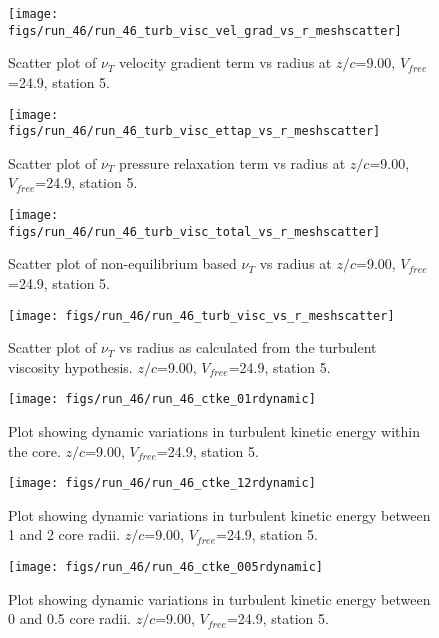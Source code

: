 \begin{figure}[H]
\centering
\texttt{[image: figs/run\_46/run\_46\_turb\_visc\_vel\_grad\_vs\_r\_meshscatter]}
\caption{Scatter plot of $\nu_T$ velocity gradient term vs radius at $z/c$=9.00, $V_{free}$=24.9, station 5.}
\end{figure}


\begin{figure}[H]
\centering
\texttt{[image: figs/run\_46/run\_46\_turb\_visc\_ettap\_vs\_r\_meshscatter]}
\caption{Scatter plot of $\nu_T$ pressure relaxation term vs radius at $z/c$=9.00, $V_{free}$=24.9, station 5.}
\end{figure}


\begin{figure}[H]
\centering
\texttt{[image: figs/run\_46/run\_46\_turb\_visc\_total\_vs\_r\_meshscatter]}
\caption{Scatter plot of non-equilibrium based $\nu_T$ vs radius at $z/c$=9.00, $V_{free}$=24.9, station 5.}
\end{figure}


\begin{figure}[H]
\centering
\texttt{[image: figs/run\_46/run\_46\_turb\_visc\_vs\_r\_meshscatter]}
\caption{Scatter plot of $\nu_T$ vs radius as calculated from the turbulent viscosity hypothesis. $z/c$=9.00, $V_{free}$=24.9, station 5.}
\end{figure}


\begin{figure}[H]
\centering
\texttt{[image: figs/run\_46/run\_46\_ctke\_01rdynamic]}
\caption{Plot showing dynamic variations in turbulent kinetic energy within the core. $z/c$=9.00, $V_{free}$=24.9, station 5.}
\end{figure}


\begin{figure}[H]
\centering
\texttt{[image: figs/run\_46/run\_46\_ctke\_12rdynamic]}
\caption{Plot showing dynamic variations in turbulent kinetic energy between 1 and 2 core radii. $z/c$=9.00, $V_{free}$=24.9, station 5.}
\end{figure}


\begin{figure}[H]
\centering
\texttt{[image: figs/run\_46/run\_46\_ctke\_005rdynamic]}
\caption{Plot showing dynamic variations in turbulent kinetic energy between 0 and 0.5 core radii. $z/c$=9.00, $V_{free}$=24.9, station 5.}
\end{figure}


